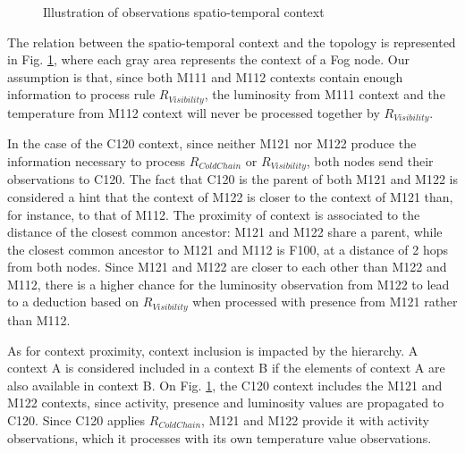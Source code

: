 \documentclass{iosart2c}
\begin{document}
\begin{figure}
	\centering
	\caption{Illustration of observations spatio-temporal context}
	\label{fig:contextuality}
	\scalebox{0.75}{
		
	}
\end{figure}

The relation between the spatio-temporal context and the topology is represented in Fig. \ref{fig:contextuality}, where each gray area represents the context of a Fog node.
Our assumption is that, since both M111 and M112 contexts contain enough information to process rule $R_{Visibility}$, the luminosity from M111 context and the temperature from M112 context will never be processed together by $R_{Visibility}$.

In the case of the C120 context, since neither M121 nor M122 produce the information necessary to process $R_{ColdChain}$ or $R_{Visibility}$, both nodes send their observations to C120.
The fact that C120 is the parent of both M121 and M122 is considered a hint that the context of M122 is closer to the context of M121 than, for instance, to that of M112.
The proximity of context is associated to the distance of the closest common ancestor: M121 and M122 share a parent, while the closest common ancestor to M121 and M112 is F100, at a distance of 2 hops from both nodes.
Since M121 and M122 are closer to each other than M122 and M112, there is a higher chance for the luminosity observation from M122 to lead to a deduction based on $R_{Visibility}$ when processed with presence from M121 rather than M112.

As for context proximity, context inclusion is impacted by the hierarchy.
A context A is considered included in a context B if the elements of context A are also available in context B.
On Fig. \ref{fig:contextuality}, the C120 context includes the M121 and M122 contexts, since activity, presence and luminosity values are propagated to C120.
Since C120 applies $R_{ColdChain}$, M121 and M122 provide it with activity observations, which it processes with its own temperature value observations.
\end{document}
